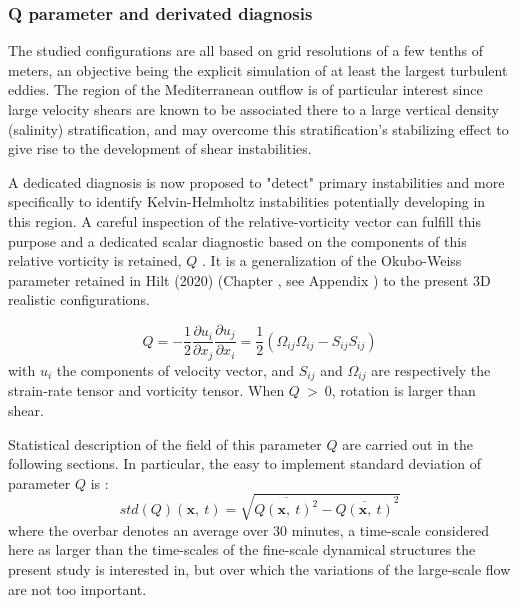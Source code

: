 
\subsubsection{Q parameter and derivated diagnosis}
\label{sectiondiagQ}

The studied configurations are all based on grid resolutions of a few tenths of meters, an objective being the explicit simulation of at least the largest turbulent eddies. The region of the Mediterranean outflow is of particular interest since large velocity shears are known to be associated there to a large vertical density (salinity) stratification, and may overcome this stratification's stabilizing effect to give rise to the development of shear instabilities. 

A dedicated diagnosis is now proposed to "detect" primary instabilities and more specifically to identify Kelvin-Helmholtz instabilities potentially developing in this region. 
A careful inspection of the relative-vorticity vector can fulfill this purpose and a dedicated scalar diagnostic based on the components of this relative vorticity is retained, $Q$ \citep{cucitore_1999}. It is a generalization of the Okubo-Weiss parameter retained in Hilt (2020) (Chapter , see Appendix ) to the present 3D realistic configurations. 

\begin{equation}
Q=-\frac{1}{2} \frac{\partial u_i}{\partial x_j} \frac{\partial u_j}{\partial x_i} = \frac{1}{2} (\Omega_{ij}\Omega_{ij} - S_{ij} S_{ij})
\end{equation}
with $u_i$ the components of velocity vector, and $S_{ij}$ and $\Omega_{ij}$ are respectively the strain-rate tensor and vorticity tensor. When $Q\ >\ 0$, rotation is larger than shear.

Statistical description of the field of this parameter $Q$ are carried out in the following sections. In particular, the easy to implement standard deviation of parameter $Q$ is :
\begin{equation} 
\label{eqstdQ} 
    std ( Q ) (\mathbf{x},\ t)=  \sqrt{   \overline{Q (\mathbf{x},\ t)^{2}} -  \overline{Q(\mathbf{x},\ t)}^{2}  }
\end{equation}
where the overbar denotes an average over 30 minutes, a time-scale considered here as larger than the time-scales of the fine-scale dynamical structures the present study is interested in, but over which the variations of the large-scale flow are not too important.


